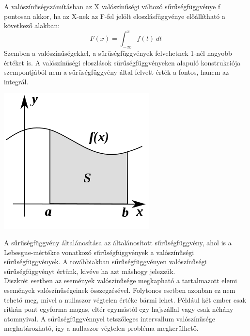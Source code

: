 \documentclass[11pt,a4paper]{article}
\begin{document}
  \begin{tcolorbox}[colback=MidnightBlue!5!white,colframe=MidnightBlue!60!black,title= Eloszlás és Sűrűségfüggvény]
    \begin{multicols*}{2}
        A valószínűségszámításban az X valószínűségi változó sűrűségfüggvénye f pontosan akkor, ha az X-nek az F-fel jelölt eloszlásfüggvénye előállítható a következő alakban:\\
        $$F(x) = \int_{-\infty}^{x} f(t)\ dt$$
        Szemben a valószínűségekkel, a sűrűségfüggvények felvehetnek 1-nél nagyobb értéket is. A valószínűségi eloszlások sűrűségfüggvényeken alapuló konstrukciója szempontjából nem a sűrűségfüggvény által felvett érték a fontos, hanem az integrál.
        \columnbreak
        \begin{center}
            \includegraphics*[width=.4\textwidth]{suru.png}
        \end{center}
    \end{multicols*}
    A sűrűségfüggvény általánosítása az általánosított sűrűségfüggvény, ahol is a Lebesgue-mértékre vonatkozó sűrűségfüggvények a valószínűségi sűrűségfüggvények. A továbbiakban sűrűségfüggvényen valószínűségi sűrűségfüggvényt értünk, kivéve ha azt máshogy jelezzük.\\
    Diszkrét esetben az események valószínűsége megkapható a tartalmazott elemi események valószínűségeinek összegzésével. Folytonos esetben azonban ez nem tehető meg, mivel a nullaszor végtelen értéke bármi lehet. Például két ember csak ritkán pont egyforma magas, eltér egymástól egy hajszállal vagy csak néhány atomnyival. A sűrűségfüggvénnyel tetszőleges intervallum valószínűsége meghatározható, így a nullaszor végtelen probléma megkerülhető.
  \end{tcolorbox}
\end{document}
